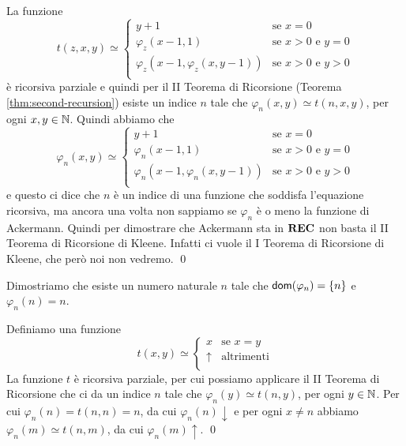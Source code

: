 \documentclass[runningheads,a4paper]{llncs}
\begin{document}
\begin{solution}
La funzione 
$$
t(z,x,y) \simeq
\begin{cases}
y+1 & \mbox{se $x = 0$} \\
\varphi_z(x-1,1)        & \mbox{se $x > 0$ e $y = 0$} \\
\varphi_z(x-1,\varphi_z(x,y-1)) & \mbox{se $x >0$ e $y>0$} \\
\end{cases}
$$
\`{e} ricorsiva parziale e quindi per il II Teorema di Ricorsione (Teorema \ref{thm:second-recursion}) esiste un indice
 $n$ tale che $\varphi_{n}(x,y) \simeq t(n,x,y)$, per ogni $x,y \in \mathbb{N}$. Quindi abbiamo che
$$
\varphi_{n}(x,y) \simeq
\begin{cases}
y+1 & \mbox{se $x = 0$} \\
\varphi_{n}(x-1,1)        & \mbox{se $x > 0$ e $y = 0$} \\
\varphi_{n}(x-1,\varphi_{n}(x,y-1)) & \mbox{se $x >0$ e $y>0$} \\
\end{cases}
$$
e questo ci dice che $n$ \`{e} un indice di una funzione che soddisfa l'equazione ricorsiva, ma ancora una volta non sappiamo se 
 $\varphi_n$ \`{e} o meno la funzione di Ackermann. Quindi per dimostrare che Ackermann sta in $\mathbf{REC}$ non basta il II Teorema di Ricorsione
 di Kleene. Infatti ci vuole il I Teorema di Ricorsione di Kleene, che per\`{o} noi non vedremo.
\qed\end{solution}

\begin{exercise}
Dimostriamo che esiste un numero naturale $n$ tale che $\mathsf{dom}(\varphi_n) = \{n\}$ e $\varphi_n(n) = n$.
\end{exercise}

\begin{solution}
Definiamo una funzione 
$$
t(x,y) \simeq
\begin{cases}
x         & \mbox{se $x = y$} \\
\uparrow  & \mbox{altrimenti} \\
\end{cases}
$$
La funzione $t$ \`{e} ricorsiva parziale, per cui possiamo applicare il II Teorema di Ricorsione che ci da 
 un indice $n$ tale che $\varphi_{n}(y) \simeq t(n,y)$, per ogni $y \in \mathbb{N}$. Per cui $\varphi_n(n) = t(n,n) = n$,
 da cui $\varphi_n(n)\downarrow$ e per ogni $x \neq n$ abbiamo $\varphi_n(m) \simeq t(n,m)$, da cui $\varphi_n(m)\uparrow$.
\qed\end{solution}

%
\end{document}
